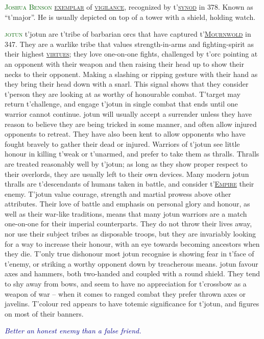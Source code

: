 \documentclass[twoside,11pt,b5paper,twocolumn]{scrbook}
\newcommand{\estcab}[1]{\textsc{\textcolor{marron}{#1}}}
\newcommand{\keyword}[1]{\textcolor{darkgreen}{#1}}
\renewcommand{\paragraph}[1]{\par\noindent\markboth{#1}{#1}\estcab{\keyword{#1}}\label{#1} }
\newcommand{\see}[1]{{\estcab{\hyperref[#1]{#1}}}}
\newcommand{\proverb}[1]{\par \textcolor{darkblue}{\itshape #1}}
\begin{document}
\paragraph{Joshua Benson} \see{exemplar} of \see{vigilance}, recognized by t'\see{synod} in 378. Known as “t'major”. He is usually depicted on top of a tower with a shield, holding watch.
\paragraph{jotun} t'jotun are t'tribe of barbarian orcs that have captured t'\see{Mournwold} in 347. They are a warlike tribe that values strength-in-arms and fighting-spirit as their highest \see{virtues}; they love one-on-one fights, challenged by t'orc pointing at an opponent with their weapon and then raising their head up to show their necks to their opponent. Making a slashing or ripping gesture with their hand as they bring their head down with a snarl. This signal shows that they consider t'person they are looking at as worthy of honourable combat. T'target may return t'challenge, and engage t'jotun in single combat that ends until one warrior cannot continue. jotun will usually accept a surrender unless they have reason to believe they are being tricked in some manner, and often allow injured opponents to retreat. They have also been kent to allow opponents who have fought bravely to gather their dead or injured. Warriors of t'jotun see little honour in killing t'weak or t'unarmed, and prefer to take them as thralls. Thralls are treated reasonably well by t'jotun; as long as they show proper respect to their overlords, they are usually left to their own devices. Many modern jotun thralls are t'descendants of humans taken in battle, and consider t'\see{Empire} their enemy. T'jotun value courage, strength and martial prowess above other attributes. Their love of battle and emphasis on personal glory and honour, as well as their war-like traditions, means that many jotun warriors are a match one-on-one for their imperial counterparts. They do not throw their lives away, nor use their subject tribes as disposable troops, but they are invariably looking for a way to increase their honour, with an eye towards becoming ancestors when they die. T'only true dishonour most jotun recognise is showing fear in t'face of t'enemy, or striking a worthy opponent down by treacherous means. jotun favour axes and hammers, both two-handed and coupled with a round shield. They tend to shy away from bows, and seem to have no appreciation for t'crossbow as a weapon of war – when it comes to ranged combat they prefer thrown axes or javelins. T'colour red appears to have totemic significance for t'jotun, and figures on most of their banners. \proverb{Better an honest enemy than a false friend.}
\end{document}
